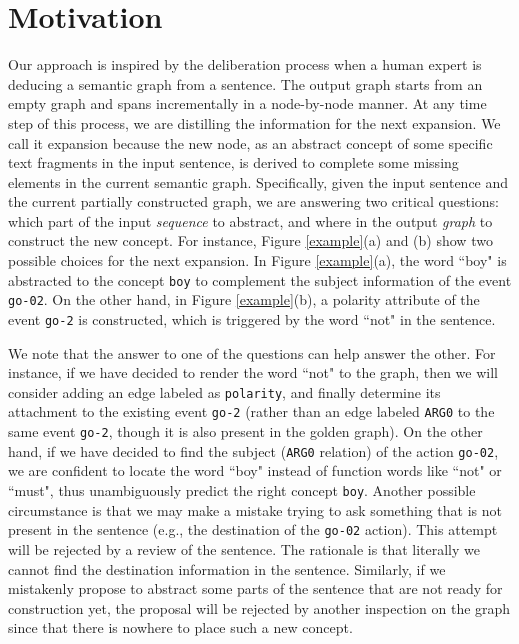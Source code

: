 \documentclass[11pt,a4paper]{article}
\begin{document}
	\section{Motivation}
	Our approach is inspired by the deliberation process when a human expert is deducing a semantic graph from a sentence. The output graph starts from an empty graph and spans incrementally in a node-by-node manner. At any time step of this process, we are distilling the information for the next expansion. We call it expansion because the new node, as an abstract concept of some specific text fragments in the input sentence, is derived to complete some missing elements in the current semantic graph. Specifically, given the input sentence and the current partially constructed graph, we are answering two critical questions: which part of the input \textit{sequence} to abstract, and where in the output \textit{graph} to construct the new concept. For instance, Figure \ref{example}(a) and (b) show two possible choices for the next expansion. In Figure \ref{example}(a), the word ``boy" is abstracted to the concept \texttt{boy} to complement the subject information of the event \texttt{go-02}. On the other hand, in Figure \ref{example}(b), a polarity attribute of the event \texttt{go-2} is constructed, which is triggered by the word ``not" in the sentence.
	
	We note that the answer to one of the questions can help answer the other. For instance,  if we have decided to render the word ``not" to the graph, then we will consider adding an edge labeled as \texttt{polarity}, and finally determine its attachment to the existing event \texttt{go-2} (rather than an edge labeled \texttt{ARG0} to the same event \texttt{go-2}, though it is also present in the golden graph). On the other hand, if we have decided to find the subject (\texttt{ARG0}  relation) of the action \texttt{go-02}, we are confident to locate the word ``boy" instead of function words like ``not" or ``must", thus unambiguously predict the right concept \texttt{boy}. Another possible circumstance is that we may make a mistake trying to ask something that is not present in the sentence (e.g., the destination of the \texttt{go-02} action). This attempt will be rejected by a review of the sentence. The rationale is that literally we cannot find the destination information in the sentence. Similarly, if we mistakenly propose to abstract some parts of the sentence that are not ready for construction yet, the proposal will be rejected by another inspection on the graph since that there is nowhere to place such a new concept.
	
\end{document}
